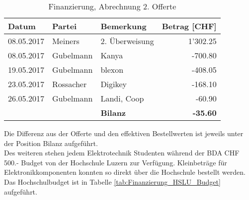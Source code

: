 \begin{table}[H]
	\small
	\centering
	\caption{Finanzierung, Abrechnung 2. Offerte}
	\begin{tabular}{lrlr}
		\hline
		\multicolumn{1}{|l|}{\textbf{Datum}} & \multicolumn{1}{l|}{\textbf{Partei}} & \multicolumn{1}{l|}{\textbf{Bemerkung}} & \multicolumn{1}{l|}{\textbf{Betrag [CHF]}} \\
		\hline
		\multicolumn{1}{|l|}{08.05.2017} & \multicolumn{1}{l|}{Meiners} & \multicolumn{1}{l|}{2. Überweisung} & \multicolumn{1}{r|}{1'302.25} \\
		\hline
		\multicolumn{1}{|l|}{08.05.2017} & \multicolumn{1}{l|}{Gubelmann} & \multicolumn{1}{l|}{Kanya} & \multicolumn{1}{r|}{-700.80} \\
		\hline
		\multicolumn{1}{|l|}{19.05.2017} & \multicolumn{1}{l|}{Gubelmann} & \multicolumn{1}{l|}{blexon} & \multicolumn{1}{r|}{-408.05} \\
		\hline
		\multicolumn{1}{|l|}{23.05.2017} & \multicolumn{1}{l|}{Rossacher} & \multicolumn{1}{l|}{Digikey} & \multicolumn{1}{r|}{-168.10} \\
		\hline
		\multicolumn{1}{|l|}{26.05.2017} & \multicolumn{1}{l|}{Gubelmann} & \multicolumn{1}{l|}{Landi, Coop} & \multicolumn{1}{r|}{-60.90} \\
		\hline
		&       & \textbf{Bilanz} & \textbf{-35.60} \\
	\end{tabular}%
	\label{tab:Finanzierung_Offerte2}%
\end{table}%

Die Differenz aus der Offerte und den effektiven Bestellwerten ist jeweils unter der Position Bilanz aufgeführt.\\
Des weiteren stehen jedem Elektrotechnik Studenten während der BDA CHF 500.- Budget von der Hochschule Luzern zur Verfügung. Kleinbeträge für Elektronikkomponenten konnten so direkt über die Hochschule bestellt werden. Das Hochschulbudget ist in Tabelle \ref{tab:Finanzierung_HSLU_Budget} aufgeführt.

